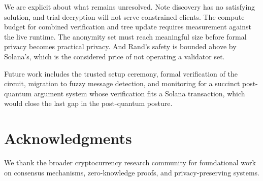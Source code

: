 \documentclass[11pt,a4paper]{article}
\begin{document}
We are explicit about what remains unresolved. Note discovery has no satisfying solution, and trial decryption will not serve constrained clients. The compute budget for combined verification and tree update requires measurement against the live runtime. The anonymity set must reach meaningful size before formal privacy becomes practical privacy. And Rand's safety is bounded above by Solana's, which is the considered price of not operating a validator set.

Future work includes the trusted setup ceremony, formal verification of the circuit, migration to fuzzy message detection, and monitoring for a succinct post-quantum argument system whose verification fits a Solana transaction, which would close the last gap in the post-quantum posture.

\section*{Acknowledgments}

We thank the broader cryptocurrency research community for foundational work on consensus mechanisms, zero-knowledge proofs, and privacy-preserving systems.
\end{document}

